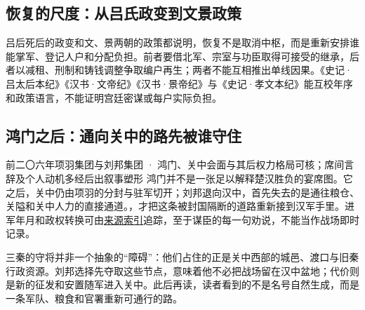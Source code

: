 \subsection{恢复的尺度：从吕氏政变到文景政策}

吕后死后的政变和文、景两朝的政策都说明，恢复不是取消中枢，而是重新安排谁能掌军、登记人户和分配负担。前者要借北军、宗室与功臣取得可接受的继承，后者以减租、刑制和铸钱调整争取编户再生；两者不能互相推出单线因果。《史记·吕太后本纪》《汉书·文帝纪》《汉书·景帝纪》与《史记·孝文本纪》能互校年序和政策语言，不能证明宫廷密谋或每户实际负担。

\subsection{鸿门之后：通向关中的路先被谁守住}
\begin{event}{}{前二〇六年}{项羽集团与刘邦集团 · 鸿门、关中}{会面与其后权力格局可核；席间言辞及个人动机多经后出叙事塑形}
鸿门并不是一张足以解释楚汉胜负的宴席图。它之后，关中仍由项羽的分封与驻军切开；刘邦退向汉中，首先失去的是通往粮仓、关隘和关中人力的直接通道。，才把这条被封国隔断的道路重新接到汉军手里。进军年月和政权转换可由\hyperref[app:sources]{来源索引}追踪，至于谋臣的每一句劝说，不能当作战场即时记录。

三秦的守将并非一个抽象的“障碍”：他们占住的正是关中西部的城邑、渡口与旧秦行政资源。刘邦选择先夺取这些节点，意味着他不必把战场留在汉中盆地；代价则是新的征发和安置随军进入关中。此后再读，读者看到的不是名号自然生成，而是一条军队、粮食和官署重新可通行的路。
\end{event}